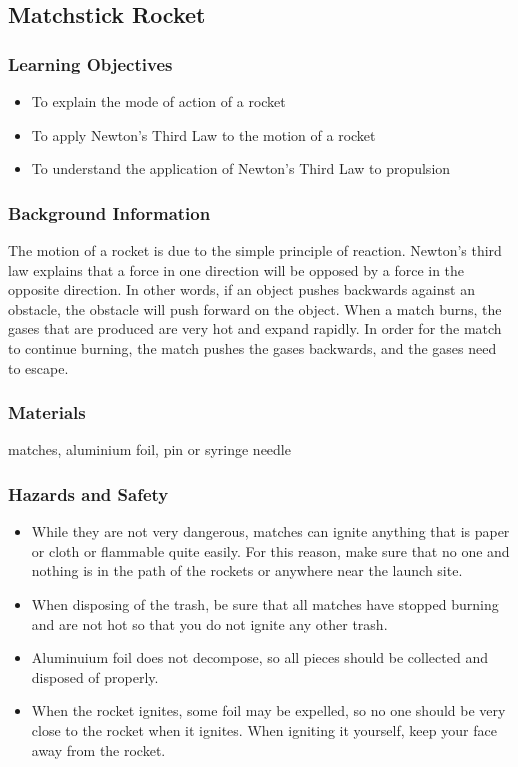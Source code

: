 \subsection{Matchstick Rocket}

\subsubsection*{Learning Objectives}
\begin{itemize}
\item{To explain the mode of action of a rocket} 
\item{To apply Newton's Third Law to the motion of a rocket} 
\item{To understand the application of Newton's Third Law to propulsion} 
\end{itemize}

\subsubsection*{Background Information}
The motion of a rocket is due to the simple principle of reaction.  Newton's third law explains that a force in one direction will be opposed by a force in the opposite direction.  In other words, if an object pushes backwards against an obstacle, the obstacle will push forward on the object.  When a match burns, the gases that are produced are very hot and expand rapidly. In order for the match to continue burning, the match pushes the gases backwards, and the gases need to escape.

\subsubsection*{Materials}
matches, aluminium foil, pin or syringe needle

\subsubsection*{Hazards and Safety}
\begin{itemize}
\item{While they are not very dangerous, matches can ignite anything that is paper or cloth or flammable quite easily. For this reason, make sure that no one and nothing is in the path of the rockets or anywhere near the launch site.} 
\item{When disposing of the trash, be sure that all matches have stopped burning and are not hot so that you do not ignite any other trash.} 
\item{Aluminuium foil does not decompose, so all pieces should be collected and disposed of properly.} 
\item{When the rocket ignites, some foil may be expelled, so no one should be very close to the rocket when it ignites. When igniting it yourself, keep your face away from the rocket.} 
\end{itemize}

